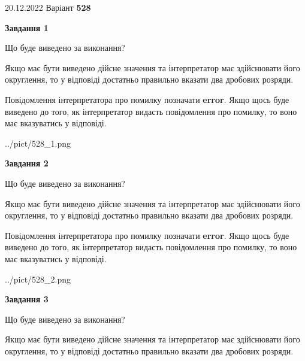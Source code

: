 \documentclass[12pt, ukrainian]{article}
\begin{document}
{20.12.2022 Варіант \No \textbf { 528 }\par}
{
\begin {Large}

{\begin {center}\textbf{Завдання 1}\end {center}}\par
Що буде виведено за виконання? \par

Якщо має бути виведено дійсне значення та інтерпретатор має здійснювати його округлення, 
то у відповіді достатньо правильно вказати два дробових розряди.

Повідомлення інтерпретатора про помилку позначати \textbf{error}.
Якщо щось буде виведено до того, як інтерпретатор видасть повідомлення про помилку, 
то воно має вказуватись у відповіді. \par

\begin{center}
	{../pict/528_1.png}
\end{center}
\newpage

{\begin {center}\textbf{Завдання 2}\end {center}}\par
Що буде виведено за виконання? \par

Якщо має бути виведено дійсне значення та інтерпретатор має здійснювати його округлення, 
то у відповіді достатньо правильно вказати два дробових розряди.

Повідомлення інтерпретатора про помилку позначати \textbf{error}.
Якщо щось буде виведено до того, як інтерпретатор видасть повідомлення про помилку, 
то воно має вказуватись у відповіді. \par

\begin{center}
	{../pict/528_2.png}
\end{center}
\newpage

{\begin {center}\textbf{Завдання 3}\end {center}}\par
Що буде виведено за виконання? \par

Якщо має бути виведено дійсне значення та інтерпретатор має здійснювати його округлення, 
то у відповіді достатньо правильно вказати два дробових розряди.


\end{Large}}
\end{document}
